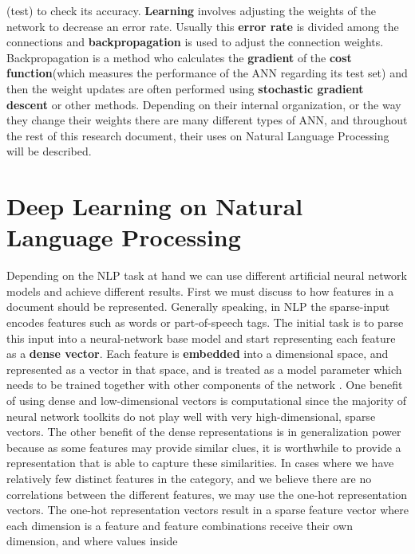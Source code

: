\documentclass{scrartcl}
\begin{document}
    (test) to check its accuracy. 
    \textbf{Learning} involves adjusting the weights of the network 
    to decrease an error rate. Usually this \textbf{error rate} is divided among the connections and 
    \textbf{backpropagation} is used to adjust the connection weights. Backpropagation is a method
    who calculates the \textbf{gradient} of the \textbf{cost function}(which measures the performance
    of the ANN regarding its test set) and then the weight updates are often performed using
    \textbf{stochastic gradient descent} or other methods.
    Depending on their internal organization, or the way they change their weights there are many
    different types of ANN, and throughout the rest of this research document, their uses on
    Natural Language Processing will be described.
    \section{ Deep Learning on Natural Language Processing }
    Depending on the NLP task at hand we can use different artificial neural network models and
    achieve different results.
    First we must discuss to how features in a document should be represented. \newline
    Generally speaking, in NLP the sparse-input encodes features such as words
    or part-of-speech tags. The initial task is to parse this input into a neural-network
    base model and start representing each feature as a \textbf{dense vector}. 
    Each feature is \textbf{embedded} into a dimensional space, and represented as a vector in 
    that space, and is treated as a model parameter which needs to be trained together 
    with other components of the network \cite{nn-nlp}.
    One benefit of using dense and low-dimensional vectors is computational since
    the majority of neural network toolkits do not play well with very high-dimensional, sparse  
    vectors. The other benefit of the dense representations is in generalization power because 
    as some features may provide similar clues, it is worthwhile to provide a representation that
    is able to capture these similarities. \newline
    In cases where we have relatively few distinct features in the category, and we believe
    there are no correlations between the different features,
    we may use the one-hot representation vectors.
    The one-hot representation vectors result in a sparse feature vector where each dimension
    is a feature and feature combinations receive their own dimension, and where values inside
\end{document}
